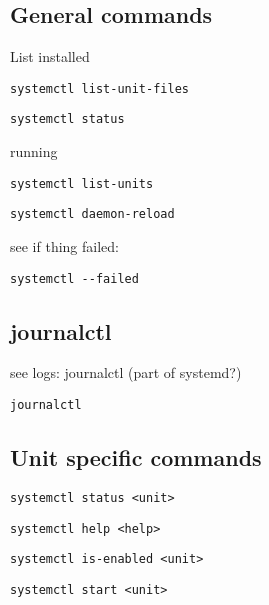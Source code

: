 \subsection{General commands}

List installed
\begin{verbatim}
systemctl list-unit-files
\end{verbatim}

\begin{verbatim}
systemctl status
\end{verbatim}

running
\begin{verbatim}
systemctl list-units
\end{verbatim}


\begin{verbatim}
systemctl daemon-reload
\end{verbatim}



see if thing failed:

\begin{verbatim}
systemctl --failed
\end{verbatim}



\subsection{journalctl}

see logs: journalctl (part of systemd?)
\begin{verbatim}
journalctl
\end{verbatim}

\subsection{Unit specific commands}

\begin{verbatim}
systemctl status <unit>
\end{verbatim}

\begin{verbatim}
systemctl help <help>
\end{verbatim}

\begin{verbatim}
systemctl is-enabled <unit>
\end{verbatim}

\begin{verbatim}
systemctl start <unit>
\end{verbatim}

